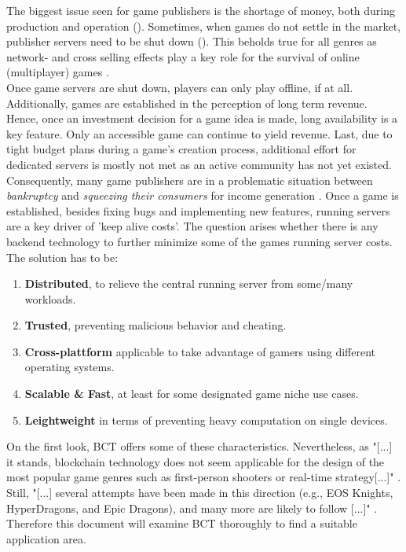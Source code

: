 The biggest issue seen for game publishers is the shortage of money, both during production and operation (\cite{Koster.2018}).
Sometimes, when games do not settle in the market, publisher servers need to be shut down (\cite{rockpapershotgun.com.2021}).
This beholds true for all genres as network- and cross selling effects play a key role for the survival of online (multiplayer) games \cite[45]{Rong.2018}. \\
Once game servers are shut down, players can only play offline, if at all.
Additionally, games are established in the perception of long term revenue.
Hence, once an investment decision for a game idea is made, long availability is a key feature.
Only an accessible game can continue to yield revenue.
Last, due to tight budget plans during a game's creation process, additional effort for dedicated servers is mostly not met as an active community has not yet existed.
Consequently, many game publishers are in a problematic situation between \textit{bankruptcy} and \textit{squeezing their consumers} for income generation \cite{Sotamaa.2021}.
Once a game is established, besides fixing bugs and implementing new features, running servers are a key driver of 'keep alive costs'.
The question arises whether there is any backend technology to further minimize some of the games running server costs.
The solution has to be:
\begin{enumerate}
	\item \textbf{Distributed}, to relieve the central running server from some/many workloads.
	\item \textbf{Trusted}, preventing malicious behavior and cheating.
	\item \textbf{Cross-plattform} applicable to take advantage of gamers using different operating systems.
	\item \textbf{Scalable \& Fast}, at least for some designated game niche use cases.
	\item \textbf{Leightweight} in terms of preventing heavy computation on single devices.
\end{enumerate}
On the first look, \gls{BCT} offers some of these characteristics.
Nevertheless, as "[...] it stands, blockchain technology does not seem applicable for the design of the most popular game genres such as first-person shooters or real-time strategy[...]" \cite[3]{Serada.2020}.
Still, "[...] several attempts have been made in this direction (e.g., EOS Knights, HyperDragons, and Epic Dragons), and many more are likely to follow [...]" \cite[3]{Serada.2020}. \\
Therefore this document will examine \gls{BCT} thoroughly to find a suitable application area.



